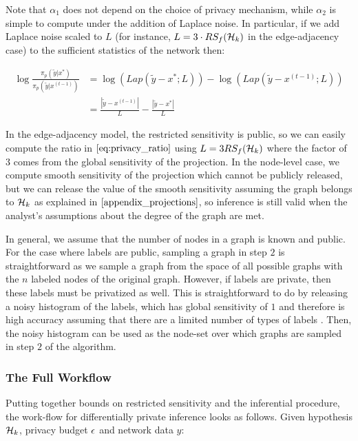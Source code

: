 Note that $\alpha_1$ does not depend on the choice of privacy mechanism, while $\alpha_2$ is simple to compute under the addition of Laplace noise. In particular, if we add Laplace noise scaled to $L$ (for instance, $L= 3 \cdot RS_f(\mathcal{H}_k)$ in the edge-adjacency case) to the sufficient statistics of the network then:

\begin{align}
\label{eq:privacy_ratio}
\log \frac{\pi_p(\tilde{y} | x^*) }{\pi_p(\tilde{y} | x^{(t-1)})} & = \log \left(Lap\left(\tilde{y} - x^*  ; L \right)  \right) -  \log \left(Lap\left(\tilde{y} - x^{(t-1)} ; L \right) \right) \\ \nonumber
& = \frac{|\tilde{y} - x^{(t-1)} | }{L} - \frac{|\tilde{y} - x^* | }{L}
\end{align}

 In the edge-adjacency model, the restricted sensitivity is public, so  we can easily compute the ratio in $\cref{eq:privacy_ratio}$ using $L=3RS_f(\mathcal{H}_k)$ where the factor of $3$ comes from the global sensitivity of the projection. In the node-level case, we compute smooth sensitivity of the projection which cannot be publicly released, but we can release the value of the smooth sensitivity assuming the graph belongs to $\mathcal{H}_k$ as explained in $\Cref{appendix_projections}$, so inference is still valid when the analyst's assumptions about the degree of the graph are met.
 
 In general, we assume that the number of nodes in a graph is known and public. For the case where labels are public, sampling a graph in step $2$ is straightforward as we sample a graph from the space of all possible graphs with the $n$ labeled nodes of the original graph. However, if labels are private, then these labels must be privatized as well. This is straightforward to do by releasing a noisy histogram of the labels, which has global sensitivity of $1$ and therefore is high accuracy assuming that there are a limited number of types of labels \cite{DMNS06}. Then, the noisy histogram can be used as the node-set over which graphs are sampled in step $2$ of the algorithm.

\subsubsection{The Full Workflow}

Putting together bounds on restricted sensitivity and the inferential procedure, the work-flow for differentially private inference looks as follows. Given hypothesis $\mathcal{H}_k$, privacy budget $\epsilon$ and network data $y$:

